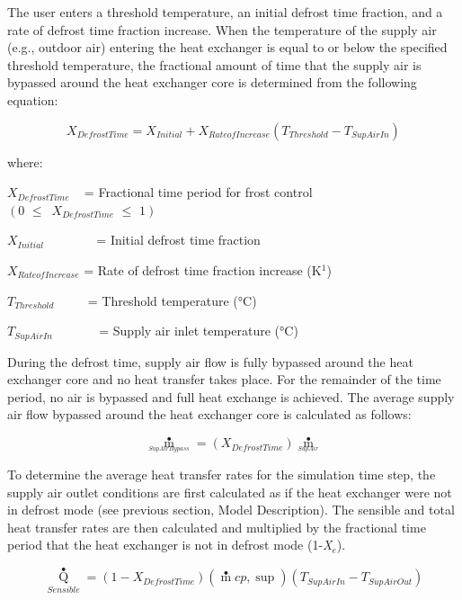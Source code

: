 The user enters a threshold temperature, an initial defrost time fraction, and a rate of defrost time fraction increase. When the temperature of the supply air (e.g., outdoor air) entering the heat exchanger is equal to or below the specified threshold temperature, the fractional amount of time that the supply air is bypassed around the heat exchanger core is determined from the following equation:

\begin{equation}
{X_{DefrostTime}} = {X_{Initial}} + {X_{RateofIncrease}}({T_{Threshold}} - {T_{SupAirIn}})
\end{equation}

where:

\({X_{DefrostTime}}\) ~ = Fractional time period for frost control \(\left( {0\,\, \le \,\,\,{X_{DefrostTime}}\,\, \le \,\,1} \right)\)

\({X_{Initial}}\) ~~~~~~~ = Initial defrost time fraction

\({X_{RateofIncrease}}\) = Rate of defrost time fraction increase (K\(^{1}\))

\({T_{Threshold}}\) ~~~~ = Threshold temperature (°C)

\({T_{SupAirIn}}\) ~~~~~~ = Supply air inlet temperature (°C)

During the defrost time, supply air flow is fully bypassed around the heat exchanger core and no heat transfer takes place. For the remainder of the time period, no air is bypassed and full heat exchange is achieved. The average supply air flow bypassed around the heat exchanger core is calculated as follows:

\begin{equation}
{\mathop m\limits^ \bullet_{_{SupAirBypass}}} = ({X_{DefrostTime}}){\mathop m\limits^ \bullet_{_{SupAir}}}
\end{equation}

To determine the average heat transfer rates for the simulation time step, the supply air outlet conditions are first calculated as if the heat exchanger were not in defrost mode (see previous section, Model Description). The sensible and total heat transfer rates are then calculated and multiplied by the fractional time period that the heat exchanger is not in defrost mode (1-\emph{X\(_{e}\)}).

\begin{equation}
{\mathop Q\limits^ \bullet_{Sensible}} = (1 - {X_{DefrostTime}})\left( {\mathop m\limits^ \bullet  cp,\sup } \right)({T_{SupAirIn}} - {T_{SupAirOut}})
\end{equation}

